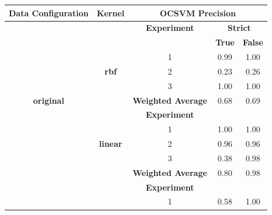 \documentclass{mpaper}
\begin{document}
\begin{table}[]
\centering
\begin{tabular}{|c|c|ccc|}
\hline
\textbf{Data Configuration} & \textbf{Kernel} & \multicolumn{3}{c|}{\textbf{OCSVM Precision}}                                         \\ \hline
\multicolumn{1}{|l|}{}      & \textbf{}       & \multicolumn{1}{c|}{\textbf{Experiment}}       & \multicolumn{2}{c|}{\textbf{Strict}} \\ \cline{3-5} 
                            &                 & \multicolumn{1}{l|}{}                          & \textbf{True}    & \textbf{False}    \\ \cline{3-5} 
                            &                 & \multicolumn{1}{c|}{1}                         & 0.99             & 1.00              \\
\multicolumn{1}{|l|}{}      & \textbf{rbf}    & \multicolumn{1}{c|}{2}                         & 0.23             & 0.26              \\
                            &                 & \multicolumn{1}{c|}{3}                         & 1.00             & 1.00              \\ \cline{3-5} 
\textbf{original}           &                 & \multicolumn{1}{c|}{\textbf{Weighted Average}} & 0.68             & 0.69              \\ \cline{2-5} 
                            &                 & \multicolumn{1}{c|}{\textbf{Experiment}}       & \textbf{}        & \textbf{}         \\ \cline{3-5} 
                            &                 & \multicolumn{1}{c|}{1}                         & 1.00             & 1.00              \\
                            & \textbf{linear} & \multicolumn{1}{c|}{2}                         & 0.96             & 0.96              \\
                            &                 & \multicolumn{1}{c|}{3}                         & 0.38             & 0.98              \\
                            &                 & \multicolumn{1}{c|}{\textbf{Weighted Average}} & 0.80             & 0.98              \\ \hline
                            &                 & \multicolumn{1}{c|}{\textbf{Experiment}}       & \textbf{}        & \textbf{}         \\ \cline{3-5} 
                            &                 & \multicolumn{1}{c|}{1}                         & 0.58             & 1.00              \\

\end{tabular}
\end{table}
\end{document}

